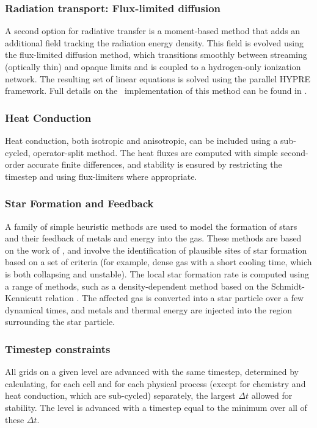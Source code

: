 \subsubsection{Radiation transport: Flux-limited diffusion}

A second option for radiative transfer is a moment-based method that
adds an additional field tracking the radiation energy density.  This
field is evolved using the flux-limited diffusion method, which
transitions smoothly between streaming (optically thin) and opaque
limits and is coupled to a hydrogen-only ionization network.  The
resulting set of linear equations is solved using the parallel HYPRE
framework.  Full details on the \enzo\ implementation of this method
can be found in \citet{ReynoldsHayesPaschosNorman2009}.

\subsubsection{Heat Conduction}

Heat conduction, both isotropic and anisotropic, can be included using
a sub-cycled, operator-split method.  The heat fluxes are computed
with simple second-order accurate finite differences, and stability is
ensured by restricting the timestep and using flux-limiters where
appropriate.

\subsubsection{Star Formation and Feedback}

A family of simple heuristic methods are used to model the formation
of stars and their feedback of metals and energy into the gas.  These
methods are based on the work of \citet{CO1992}, and involve the
identification of plausible sites of star formation based on a set of
criteria (for example, dense gas with a short cooling time, which is
both collapsing and unstable).  The local star formation rate is
computed using a range of methods, such as a density-dependent method
based on the Schmidt-Kennicutt relation \citep{K89}.  The affected gas
is converted into a star particle over a few dynamical times, and
metals and thermal energy are injected into the region surrounding the
star particle.

\subsubsection{Timestep constraints}

All grids on a given level are advanced with the same timestep,
determined by calculating, for each cell and for each physical process
(except for chemistry and heat conduction, which are sub-cycled)
separately, the largest $\Delta t$ allowed for stability. The level is
advanced with a timestep equal to the minimum over all of these
$\Delta t$.

